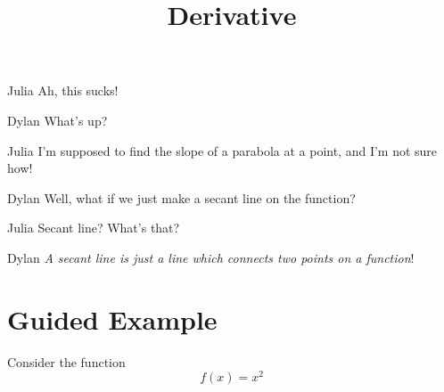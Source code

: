 \documentclass{ximera}
\title{Derivative}
\begin{document}
\maketitle
\begin{dialogue}
\item[Julia] Ah, this sucks!
\item[Dylan] What's up?
\item[Julia] I'm supposed to find the slope of a parabola at a point, and I'm not sure how!
\item[Dylan] Well, what if we just make a secant line on the function?
\item[Julia] Secant line? What's that?
\item[Dylan] \textit{A secant line is just a line which connects two points on a function}!
\end{dialogue}

\section{Guided Example}

Consider the function $$f(x) = x^2$$
\end{document}
